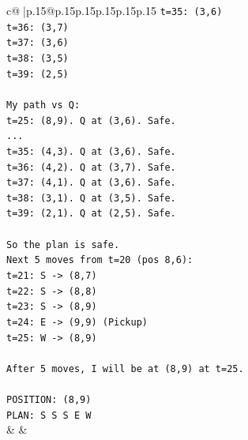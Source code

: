 \documentclass{article}
\begin{document}
{\begin{supertabular}{c@{$\;$}|p{.15\linewidth}@{}p{.15\linewidth}p{.15\linewidth}p{.15\linewidth}p{.15\linewidth}p{.15\linewidth}}
{{{\texttt{t=35: (3,6)} \\
\texttt{t=36: (3,7)} \\
\texttt{t=37: (3,6)} \\
\texttt{t=38: (3,5)} \\
\texttt{t=39: (2,5)} \\
\\ 
\texttt{My path vs Q:} \\
\texttt{t=25: (8,9). Q at (3,6). Safe.} \\
\texttt{...} \\
\texttt{t=35: (4,3). Q at (3,6). Safe.} \\
\texttt{t=36: (4,2). Q at (3,7). Safe.} \\
\texttt{t=37: (4,1). Q at (3,6). Safe.} \\
\texttt{t=38: (3,1). Q at (3,5). Safe.} \\
\texttt{t=39: (2,1). Q at (2,5). Safe.} \\
\\ 
\texttt{So the plan is safe.} \\
\texttt{Next 5 moves from t=20 (pos 8,6):} \\
\texttt{t=21: S {-}> (8,7)} \\
\texttt{t=22: S {-}> (8,8)} \\
\texttt{t=23: S {-}> (8,9)} \\
\texttt{t=24: E {-}> (9,9) (Pickup)} \\
\texttt{t=25: W {-}> (8,9)} \\
\\ 
\texttt{After 5 moves, I will be at (8,9) at t=25.} \\
\\ 
\texttt{POSITION: (8,9)} \\
\texttt{PLAN: S S S E W} \\
            }
        }
    }
    & & \\ \\


\end{supertabular}}
\end{document}
